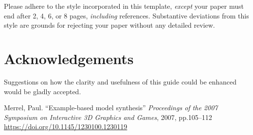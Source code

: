\documentclass[letterpaper,11pt]{article}
\begin{document}
Please adhere to the style incorporated in this template, \emph{except} your paper
must end after 2, 4, 6, or 8 pages, \emph{including} references. Substantive
deviations from this style are grounds for rejecting your paper without
any detailed review.


\section*{Acknowledgements}

Suggestions on how the clarity and usefulness of this guide could be
enhanced would be gladly accepted.

    
{\setlength{\baselineskip}{13pt} %
\raggedright				%
\begin{thebibliography}{99}








 Merrel, Paul. ``Example-based model synthesis'' \textit{Proceedings of the 2007 Symposium on Interactive 3D Graphics and Games}, 2007, pp.105--112 \url{https://doi.org/10.1145/1230100.1230119}



\end{thebibliography}
} %
   
\end{document}
